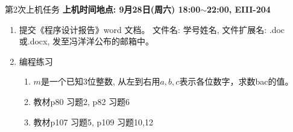 
\begin{frame}{第2次上机任务}
\textbf{上机时间地点: 9月28日(周六) 18:00$\sim$22:00, EIII-204}
\begin{enumerate}
	\item 提交《程序设计报告》word 文档。 文件名: 学号姓名, 文件扩展名: .doc或.docx, 发至冯洋洋公布的邮箱中。
	\item 编程练习
	\begin{enumerate}[a]
		\item $m$是一个已知3位整数, 从左到右用$a,b,c$表示各位数字，求数bac的值。
		\item 教材p80 习题2, p82 习题6
		\item 教材p107 习题5, p109 习题10,12
	\end{enumerate}
\end{enumerate}
\end{frame}

